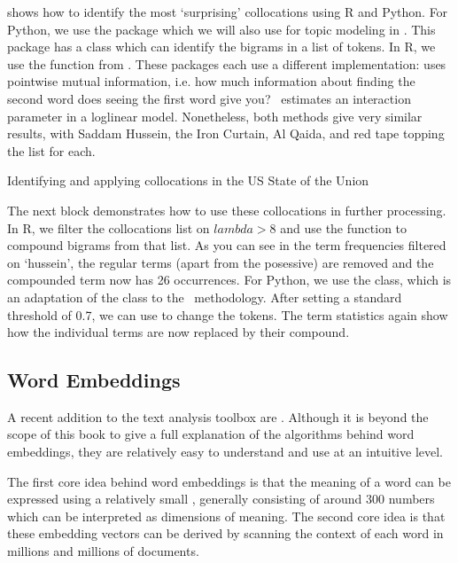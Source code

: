  shows how to identify the most `surprising' collocations using R and Python.
For Python, we use the  package which we will also use for topic modeling in .
This package has a  class which can identify the bigrams in a list of tokens.
In R, we use the  function from \quanteda.
These packages each use a different implementation:  uses pointwise mutual information, i.e.
how much information about finding the second word does seeing the first word give you?
\quanteda\ estimates an interaction parameter in a loglinear model.
Nonetheless, both methods give very similar results, with Saddam Hussein, the Iron Curtain, Al Qaida, and red tape topping the list for each.


\begin{ccsexample}
\caption{Identifying and applying collocations in the US State of the Union}\label{ex:colloc}
\end{ccsexample}


The next block demonstrates how to use these collocations in further processing.
In R, we filter the collocations list on $lambda>8$ and use the  function to compound bigrams from that list.
As you can see in the term frequencies filtered on `hussein', the regular terms (apart from the posessive) are removed and the compounded term now has 26 occurrences.
For Python, we use the  class, which is an adaptation of the  class to the \sklearn\ methodology.
After setting a standard threshold of 0.7, we can use  to change the tokens.
The term statistics again show how the individual terms are now replaced by their compound. 


\subsection{Word Embeddings}

A recent addition to the text analysis toolbox are .
Although it is beyond the scope of this book to give a full explanation of the algorithms behind word embeddings,
they are relatively easy to understand and use at an intuitive level.

The first core idea behind word embeddings is that the meaning of a word can be expressed using a relatively small , generally consisting of around 300 numbers which can be interpreted as dimensions of meaning.
The second core idea is that these embedding vectors can be derived by scanning the context of each word in millions and millions of documents.


